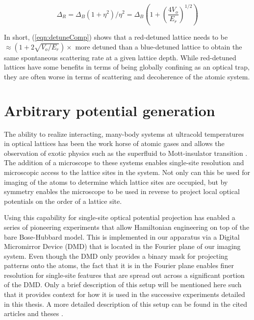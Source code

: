 \begin{equation}
\Delta_R = \Delta_B (1+\eta^2)/\eta^2 = \Delta_B \left ( 1 + \left ( \frac{4 V_o}{E_r} \right )^{1/2} \right )
\label{eqn:detuneComp}
\end{equation}

In short, (\ref{eqn:detuneComp}) shows that a red-detuned lattice needs to be $\approx \left (1+ 2 \sqrt{V_o/E_r} \right ) \times$ more detuned than a blue-detuned lattice to obtain the same spontaneous scattering rate at a given lattice depth. While red-detuned lattices have some benefits in terms of being globally confining as an optical trap, they are often worse in terms of scattering and decoherence of the atomic system.

\section{Arbitrary potential generation}
\label{sec:ch2DMD}

The ability to realize interacting, many-body systems at ultracold temperatures in optical lattices has been the work horse of atomic gases and allows the observation of exotic physics such as the superfluid to Mott-insulator transition \cite{Greiner2002,Bloch2008,Bloch2012}. The addition of a microscope to these systems enables single-site resolution and microscopic access to the lattice sites in the system. Not only can this be used for imaging of the atoms to determine which lattice sites are occupied, but by symmetry enables the microscope to be used in reverse to project local optical potentials on the order of a lattice site.

Using this capability for single-site optical potential projection has enabled a series of pioneering experiments that allow Hamiltonian engineering on top of the bare Bose-Hubbard model. This is implemented in our apparatus via a Digital Micromirror Device (DMD) that is located in the Fourier plane of our imaging system. Even though the DMD only provides a binary mask for projecting patterns onto the atoms, the fact that it is in the Fourier plane enables finer resolution for single-site features that are spread out across a significant portion of the DMD. Only a brief description of this setup will be mentioned here such that it provides context for how it is used in the successive experiments detailed in this thesis. A more detailed description of this setup can be found in the cited articles and theses \cite{Zupancic2013,Preiss2015,Zupancic2016,Lukin2018Th}.

